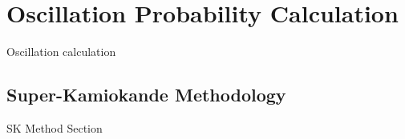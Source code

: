 \chapter{Oscillation Probability Calculation}
\label{chap:OscillationProbability}
Oscillation calculation

\section{Super-Kamiokande Methodology}
\label{sec:SKMethod}
SK Method Section
